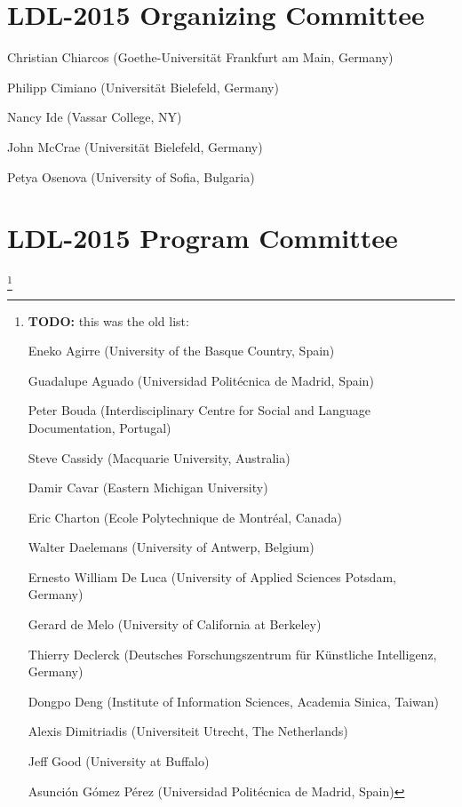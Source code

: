 \documentclass[11pt]{article}
\newcommand{\todo}[1]{\footnote{\textbf{TODO:} #1 }}
\begin{document}
\begin{figure*}[t]
\begin{minipage}{\textwidth}
\section*{LDL-2015 Organizing Committee}

\smallskip

Christian Chiarcos (Goethe-Universität Frankfurt am Main, Germany)

Philipp Cimiano (Universität Bielefeld, Germany)

Nancy Ide (Vassar College, NY)

John McCrae (Universität Bielefeld, Germany)

Petya Osenova (University of Sofia, Bulgaria)

\bigskip

\section*{LDL-2015 Program Committee}

\smallskip


\todo{ this was the old list:

	Eneko Agirre (University of the Basque Country, Spain)

	Guadalupe Aguado (Universidad Politécnica de Madrid, Spain)

	Peter Bouda (Interdisciplinary Centre for Social and Language Documentation, Portugal)

	Steve Cassidy (Macquarie University, Australia)

	Damir Cavar (Eastern Michigan University)

	Eric Charton (Ecole Polytechnique de Montréal, Canada)

	Walter Daelemans (University of Antwerp, Belgium)

	Ernesto William De Luca (University of Applied Sciences Potsdam, Germany)

	Gerard de Melo (University of California at Berkeley)

	Thierry Declerck (Deutsches Forschungszentrum für Künstliche Intelligenz, Germany)

	Dongpo Deng (Institute of Information Sciences, Academia Sinica, Taiwan)

	Alexis Dimitriadis (Universiteit Utrecht, The Netherlands)

	Jeff Good (University at Buffalo)

	Asunción Gómez Pérez (Universidad Politécnica de Madrid, Spain)

}
\end{minipage}
\end{figure*}
\end{document}
